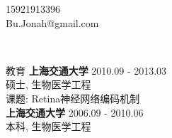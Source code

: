 \documentclass{resume} %
\begin{document}
\begin{figure}
	\centering
\end{figure}
\vspace{-60pt}
\begin{center}
	15921913396 \quad \\ \quad Bu.Jonah@gmail.com
\end{center}

\
\begin{rSection}{教育}
{\bf 上海交通大学} \hfill {2010.09 - 2013.03} \\ 
硕士, 生物医学工程 \\
课题: Retina神经网络编码机制\\

\vspace{-10pt}
{\bf 上海交通大学} \hfill {2006.09 - 2010.06} \\ 
本科, 生物医学工程 \\

\end{rSection}
\end{document}

